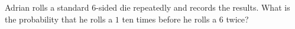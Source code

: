Adrian rolls a standard $6$-sided die repeatedly and records the results. What is the probability that he rolls a $1$ ten times before he rolls a $6$ twice?

